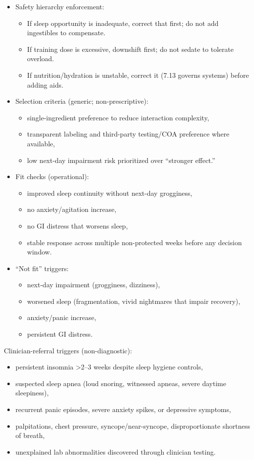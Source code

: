 \documentclass[10pt]{article}
\begin{document}
\begin{itemize}
\item Safety hierarchy enforcement:
  \begin{itemize}
  \item If sleep opportunity is inadequate, correct that first; do not add ingestibles to compensate.
  \item If training dose is excessive, downshift first; do not sedate to tolerate overload.
  \item If nutrition/hydration is unstable, correct it (7.13 governs systems) before adding aids.
  \end{itemize}
\item Selection criteria (generic; non-prescriptive):
  \begin{itemize}
  \item single-ingredient preference to reduce interaction complexity,
  \item transparent labeling and third-party testing/COA preference where available,
  \item low next-day impairment risk prioritized over “stronger effect.”
  \end{itemize}
\item Fit checks (operational):
  \begin{itemize}
  \item improved sleep continuity without next-day grogginess,
  \item no anxiety/agitation increase,
  \item no GI distress that worsens sleep,
  \item stable response across multiple non-protected weeks before any decision window.
  \end{itemize}
\item “Not fit” triggers:
  \begin{itemize}
  \item next-day impairment (grogginess, dizziness),
  \item worsened sleep (fragmentation, vivid nightmares that impair recovery),
  \item anxiety/panic increase,
  \item persistent GI distress.
  \end{itemize}
\end{itemize}

Clinician-referral triggers (non-diagnostic):

\begin{itemize}
\item persistent insomnia >2–3 weeks despite sleep hygiene controls,
\item suspected sleep apnea (loud snoring, witnessed apneas, severe daytime sleepiness),
\item recurrent panic episodes, severe anxiety spikes, or depressive symptoms,
\item palpitations, chest pressure, syncope/near-syncope, disproportionate shortness of breath,
\item unexplained lab abnormalities discovered through clinician testing.
\end{itemize}
\end{document}

